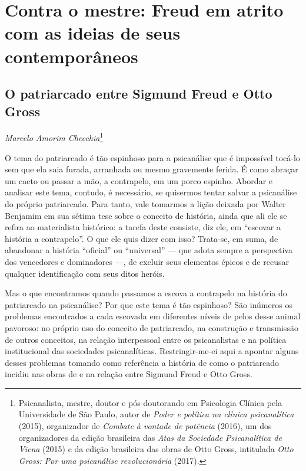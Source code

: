 \part{Contra o mestre: Freud em atrito com as ideias de seus contemporâneos}


\chapter*{O patriarcado entre Sigmund Freud e Otto Gross}


\begin{flushright}
\emph{Marcelo Amorim Checchia}\footnote{Psicanalista, mestre, doutor e
  pós-doutorando em Psicologia Clínica pela Universidade de São Paulo,
  autor de \emph{Poder e política na clínica psicanalítica} (2015),
  organizador de \emph{Combate à vontade de potência} (2016), um dos
  organizadores da edição brasileira das \emph{Atas da Sociedade
  Psicanalítica de Viena} (2015) e da edição brasileira das obras de
  Otto Gross, intitulada \emph{Otto Gross: Por uma psicanálise
  revolucionária} (2017).}
\end{flushright}

O tema do patriarcado é tão espinhoso para a psicanálise que é
impossível tocá-lo sem que ela saia furada, arranhada ou mesmo
gravemente ferida. É como abraçar um cacto ou passar a mão, a
contrapelo, em um porco espinho. Abordar e analisar este tema, contudo,
é necessário, se quisermos tentar salvar a psicanálise do próprio
patriarcado. Para tanto, vale tomarmos a lição deixada por Walter
Benjamim em sua sétima tese sobre o conceito de história, ainda que ali
ele se refira ao materialista histórico: a tarefa deste consiste, diz
ele, em ``escovar a história a contrapelo''. O que ele quis dizer com
isso? Trata-se, em suma, de abandonar a história ``oficial'' ou
``universal'' --- que adota sempre a perspectiva dos vencedores e
dominadores ---, de excluir seus elementos épicos e de recusar qualquer
identificação com seus ditos heróis.

Mas o que encontramos quando passamos a escova a contrapelo na história
do patriarcado na psicanálise? Por que este tema é tão espinhoso? São
inúmeros os problemas encontrados a cada escovada em diferentes níveis
de pelos desse animal pavoroso: no próprio uso do conceito de
patriarcado, na construção e transmissão de outros conceitos, na relação
interpessoal entre os psicanalistas e na política institucional das
sociedades psicanalíticas. Restringir-me-ei aqui a apontar alguns desses
problemas tomando como referência a história de como o patriarcado
incidiu nas obras de e na relação entre Sigmund Freud e Otto Gross.

